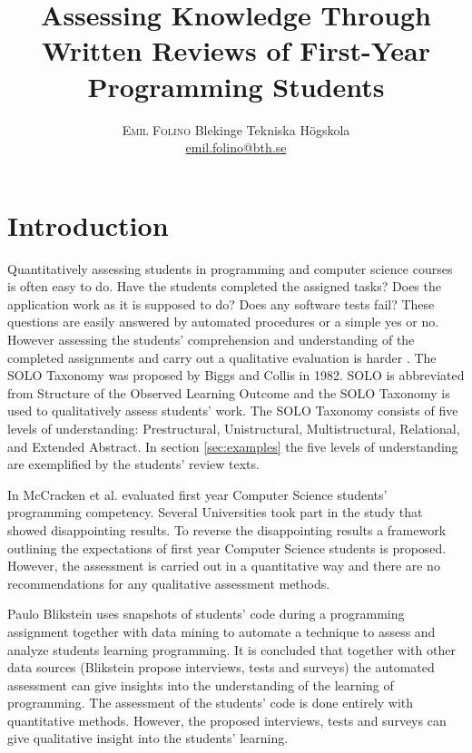 \documentclass[twoside,twocolumn,a4paper,11pt,english]{article}
\title{Assessing Knowledge Through Written Reviews of First-Year Programming Students} %
\author{%
\textsc{Emil Folino} %
\normalsize Blekinge Tekniska Högskola \\ %
\normalsize \href{mailto:emil.folino@bth.se}{emil.folino@bth.se} %
}
\date{} %
\begin{document}
\maketitle


\section{Introduction}
Quantitatively assessing students in programming and computer science courses is often easy to do. Have the students completed the assigned tasks? Does the application work as it is supposed to do? Does any software tests fail? These questions are easily answered by automated procedures or a simple yes or no. However assessing the students' comprehension and understanding of the completed assignments and carry out a qualitative evaluation is harder \cite{biggs1982evaluation}. The SOLO Taxonomy was proposed by Biggs and Collis in 1982. SOLO is abbreviated from Structure of the Observed Learning Outcome and the SOLO Taxonomy is used to qualitatively assess students' work. The SOLO Taxonomy consists of five levels of understanding: Prestructural, Unistructural, Multistructural, Relational, and Extended Abstract. In section \ref{sec:examples} the five levels of understanding are exemplified by the students' review texts.

In \cite{mccracken2001multi} McCracken et al. evaluated first year Computer Science students' programming competency. Several Universities took part in the study that showed disappointing results. To reverse the disappointing results a framework outlining the expectations of first year Computer Science students is proposed. However, the assessment is carried out in a quantitative way and there are no recommendations for any qualitative assessment methods.

Paulo Blikstein \cite{Blikstein} uses snapshots of students' code during a programming assignment together with data mining to automate a technique to assess and analyze students learning programming. It is concluded that together with other data sources (Blikstein propose interviews, tests and surveys) the automated assessment can give insights into the understanding of the learning of programming. The assessment of the students' code is done entirely with quantitative methods. However, the proposed interviews, tests and surveys can give qualitative insight into the students' learning.
\end{document}
